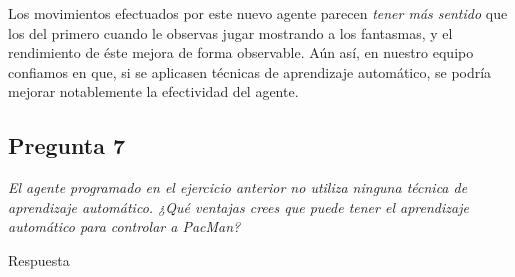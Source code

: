 \documentclass[12pt]{article}
\begin{document}
Los movimientos efectuados por este nuevo agente parecen \emph{tener más
sentido} que los del primero cuando le observas jugar mostrando a los fantasmas,
y el rendimiento de éste mejora de forma observable. Aún así, en nuestro equipo
confiamos en que, si se aplicasen técnicas de aprendizaje automático, se podría
mejorar notablemente la efectividad del agente.

\newpage
\begin{center}
\subsection{Pregunta 7}

\emph{El agente programado en el ejercicio anterior no utiliza ninguna técnica
de aprendizaje automático. ¿Qué ventajas crees que puede tener el aprendizaje
automático para controlar a PacMan?}
\end{center}
Respuesta
\end{document}
